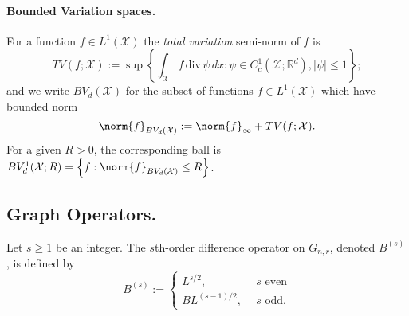\documentclass{article}
\newcommand{\Reals}{\mathbb{R}}
\newcommand{\abs}[1]{\left \lvert #1 \right \rvert}
\newcommand{\set}[1]{\left\{#1\right\}}
\newcommand{\1}{\mathbf{1}}
\newcommand{\Xsetive}{\mathrm{div}}
\theoremstyle{alden}
\theoremstyle{aldenthm}
\theoremstyle{definition}
\theoremstyle{remark}
\begin{document}
\paragraph{Bounded Variation spaces.}

For a function $f \in L^1(\mathcal{X})$ the \emph{total variation} semi-norm of $f$ is
\begin{equation*}
TV(f;\mathcal{X}) := \sup \left\{ \int_{\mathcal{X}} f \, \Xsetive \, \psi \,dx : \psi \in C_c^1(\mathcal{X}; \Reals^d), \abs{\psi} \leq 1 \right\};
\end{equation*}
and we write $BV_d(\mathcal{X})$ for the subset of functions $f \in L^1(\mathcal{X})$ which have bounded norm
\begin{equation*}
\norm{f}_{BV_d(\mathcal{X})} := \norm{f}_{\infty} + TV(f;\mathcal{X}).
\end{equation*}
For a given $R > 0$, the corresponding ball is $BV_d^{1}(\mathcal{X};R) = \set{f: \norm{f}_{BV_d(\mathcal{X})} \leq R}$. 

\subsection{Graph Operators.}
Let $s \geq 1$ be an integer. The $s$th-order difference operator on $G_{n,r}$, denoted $B^{(s)}$, is defined by
\begin{equation*}
B^{(s)} :=
\begin{cases}
L^{s/2},& ~~ s \textrm{ even} \\
BL^{(s - 1)/2},& ~~ s \textrm{ odd.}
\end{cases}
\end{equation*}
\end{document}
